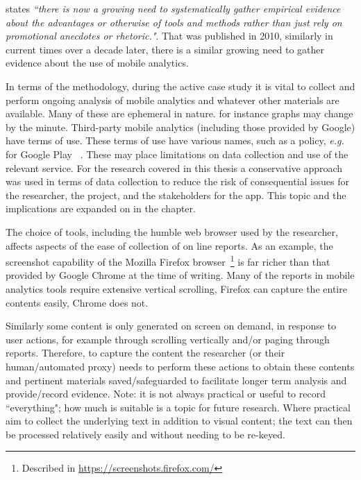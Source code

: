 \citet[p.250]{falessi2010_applying_ESE_to_sw_architecture_etc} states \emph{``there is now a growing need to systematically gather empirical evidence about the advantages or otherwise of tools and methods rather than just rely on promotional anecdotes or rhetoric."}. That was published in 2010, similarly in current times over a decade later, there is a similar growing need to gather evidence about the use of mobile analytics.

In terms of the methodology, during the active case study it is vital to collect and perform ongoing analysis of mobile analytics and whatever other materials are available. Many of these are ephemeral in nature. for instance graphs may change by the minute.  Third-party mobile analytics (including those provided by Google) have terms of use. These terms of use have various names, such as a policy, \textit{e.g.} for Google Play ~\citet{google_play_developer_policy_center}. These may place limitations on data collection and use of the relevant service. For the research covered in this thesis a conservative approach was used in terms of data collection to reduce the risk of consequential issues for the researcher, the project, and the stakeholders for the app. This topic and the implications are expanded on in the  chapter.

The choice of tools, including the humble web browser used by the researcher, affects aspects of the ease of collection of on line reports. As an example, the screenshot capability of the Mozilla Firefox browser~\footnote{Described in \url{https://screenshots.firefox.com/}} is far richer than that provided by Google Chrome at the time of writing. Many of the reports in mobile analytics tools require extensive vertical scrolling, Firefox can capture the entire contents easily, Chrome does not. 

Similarly some content is only generated on screen on demand, in response to user actions, for example through scrolling vertically and/or paging through reports. Therefore, to capture the content the researcher (or their human/automated proxy) needs to perform these actions to obtain these contents and pertinent materials saved/safeguarded to facilitate longer term analysis and provide/record evidence. Note: it is not always practical or useful to record ``everything"; how much is suitable is a topic for future research. Where practical aim to collect the underlying text in addition to visual content; the text can then be processed relatively easily and without needing to be re-keyed.


